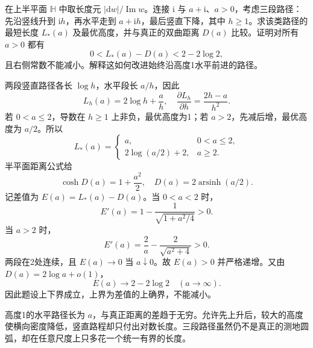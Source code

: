 \begin{exercise}[先上升再横行的路径]\label{b3:ex:13-2}
在上半平面 \(\mathbb H\) 中取长度元 \(|\mathrm dw|/\operatorname{Im}w\)。连接 \(\mathrm i\) 与 \(a+\mathrm i\)、\(a>0\)，考虑三段路径：先沿竖线升到 \(\mathrm i h\)，再水平走到 \(a+\mathrm i h\)，最后竖直下降，其中 \(h\ge1\)。求该类路径的最短长度 \(L_*(a)\) 及最优高度，并与真正的双曲距离 \(D(a)\) 比较。证明对所有 \(a>0\) 都有
\[
 0<L_*(a)-D(a)<2-2\log2,
\]
且右侧常数不能减小。解释这如何改进始终沿高度1水平前进的路径。
\end{exercise}
\begin{solution}
两段竖直路径各长 \(\log h\)，水平段长 \(a/h\)，因此
\[
 L_h(a)=2\log h+\frac ah,\quad
 \frac{\partial L_h}{\partial h}=\frac{2h-a}{h^2}.
\]
若 \(0<a\le2\)，导数在 \(h\ge1\) 上非负，最优高度为1；若 \(a>2\)，先减后增，最优高度为 \(a/2\)。所以
\[
 L_*(a)=
 \begin{cases}
 a,&0<a\le2,\\
 2\log(a/2)+2,&a\ge2.
 \end{cases}
\]
半平面距离公式给
\[
 \cosh D(a)=1+\frac{a^2}{2},\quad
 D(a)=2\operatorname{arsinh}(a/2).
\]
记差值为 \(E(a)=L_*(a)-D(a)\)。当 \(0<a<2\) 时，
\[
 E'(a)=1-\frac1{\sqrt{1+a^2/4}}>0.
\]
当 \(a>2\) 时，
\[
 E'(a)=\frac2a-\frac2{\sqrt{a^2+4}}>0.
\]
两段在2处连续，且 \(E(a)\rightarrow0\) 当 \(a\downarrow0\)。故 \(E(a)>0\) 并严格递增。又由 \(D(a)=2\log a+o(1)\)，
\[
 E(a)\longrightarrow2-2\log2\quad(a\rightarrow\infty).
\]
因此题设上下界成立，上界为差值的上确界，不能减小。

高度1的水平路径长为 \(a\)，与真正距离的差趋于无穷。允许先上升后，较大的高度使横向密度降低，竖直路程却只付出对数长度。三段路径虽然仍不是真正的测地圆弧，却在任意尺度上只多花一个统一有界的长度。
\end{solution}

